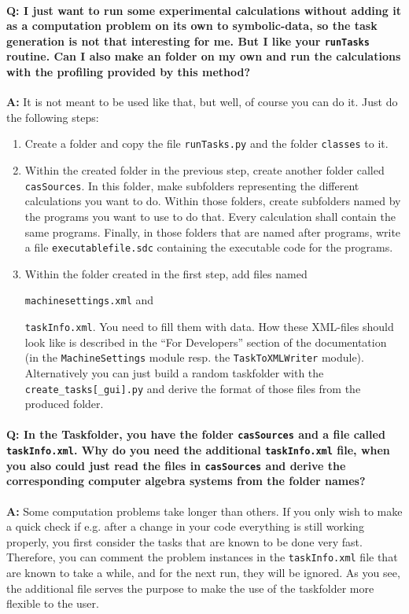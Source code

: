 \documentclass[11pt,a4paper]{amsart}
\numberwithin{equation}{section}
\theoremstyle{definition}
\begin{document}
\paragraph{\textbf{Q:} I just want to run some experimental calculations without adding it as a computation problem on its own to symbolic-data, so the task generation is not that interesting for me. But I like your \texttt{runTasks} routine. Can I also make an folder on my own and run the calculations with the profiling provided by this method?}

\textbf{A:} It is not meant to be used like that, but well, of course you can do it. Just do the following steps:
\begin{enumerate}
  \item Create a folder and copy the file \texttt{runTasks.py} and the folder \texttt{classes} to it.
  \item Within the created folder in the previous step, create another folder called \texttt{casSources}. In this folder, make subfolders representing the different calculations you want to do. Within those folders, create subfolders named by the programs you want to use to do that. Every calculation shall contain the same programs. Finally, in those folders that are named after programs, write a file \texttt{executablefile.sdc} containing the executable code for the programs.
  \item Within the folder created in the first step, add files named

\texttt{machinesettings.xml} 
and

\texttt{taskInfo.xml}. You need to fill them with data. How these XML-files should look like is described in the ``For Developers'' section of the documentation (in the \texttt{MachineSettings} module resp. the \texttt{TaskToXMLWriter} module). Alternatively you can just build a random taskfolder with the \texttt{create\_tasks[\_gui].py} and derive the format of those files from the produced folder.
\end{enumerate}

\paragraph{\textbf{Q:} In the Taskfolder, you have the folder \texttt{casSources} and a file called \texttt{taskInfo.xml}. Why do you need the additional \texttt{taskInfo.xml} file, when you also could just read the files in \texttt{casSources} and derive the corresponding computer algebra systems from the folder names?}

\textbf{A:} Some computation problems take longer than others. If you only wish to make a quick check if e.g. after a change in your code everything is still working properly, you first consider the tasks that are known to be done very fast. Therefore, you can comment the problem instances in the \texttt{taskInfo.xml} file that are known to take a while, and for the next run, they will be ignored. As you see, the additional file serves the purpose to make the use of the taskfolder more flexible to the user.
\end{document}
